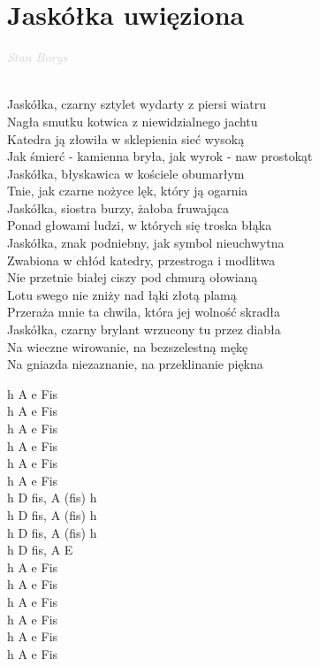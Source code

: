 \documentclass[a5paper, 10pt]{book}
\begin{document}
\section{Jaskółka uwięziona}\textcolor{lightgray}{\textit{Stan Borys}}\\~\\
\begin{minipage}[t]{0.8\textwidth}
  Jaskółka, czarny sztylet wydarty z piersi wiatru\\
  Nagła smutku kotwica z niewidzialnego jachtu\\
  Katedra ją złowiła w sklepienia sieć wysoką\\
  Jak śmierć - kamienna bryła, jak wyrok - naw prostokąt\\
  Jaskółka, błyskawica w kościele obumarłym\\
  Tnie, jak czarne nożyce lęk, który ją ogarnia\\

  \hspace*{5mm}Jaskółka, siostra burzy, żałoba fruwająca\\
  \hspace*{5mm}Ponad głowami ludzi, w których się troska błąka\\
  \hspace*{5mm}Jaskółka, znak podniebny, jak symbol nieuchwytna\\
  \hspace*{5mm}Zwabiona w chłód katedry, przestroga i modlitwa\\

  Nie przetnie białej ciszy pod chmurą ołowianą\\
  Lotu swego nie zniży nad łąki złotą plamą\\
  Przeraża mnie ta chwila, która jej wolność skradła\\
  Jaskółka, czarny brylant wrzucony tu przez diabła\\

  Na wieczne wirowanie, na bezszelestną mękę\\
  Na gniazda niezaznanie, na przeklinanie piękna\\
\end{minipage}
\begin{minipage}[t]{0.2\textwidth}
  h A e Fis\\h A e Fis\\h A e Fis\\h A e Fis\\h A e Fis\\h A e Fis\\

  h D fis, A (fis) h\\
  h D fis, A (fis) h\\
  h D fis, A (fis) h\\
  h D fis, A E\\

  h A e Fis\\h A e Fis\\h A e Fis\\h A e Fis\\

  h A e Fis\\h A e Fis\\
\end{minipage}
\end{document}
